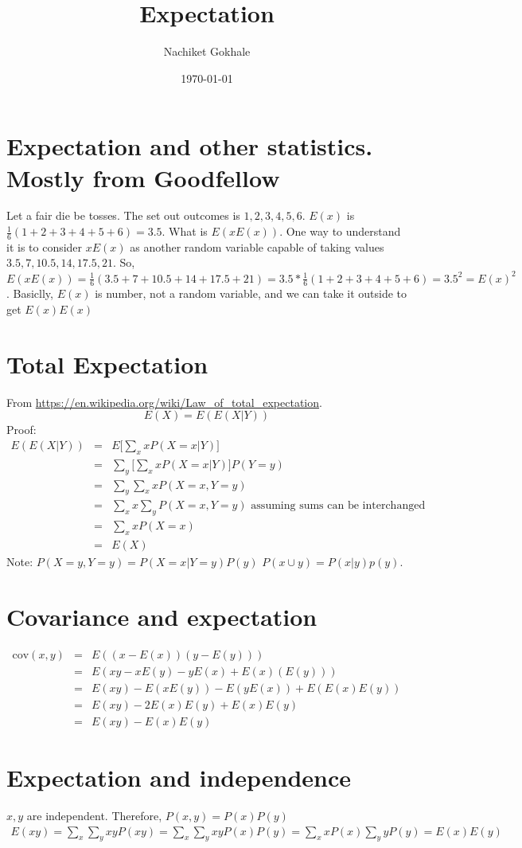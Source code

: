 \documentclass{article}
\newcommand{\beq}{\begin{equation}}
\newcommand{\eeq}{\end{equation}}
\newcommand{\ber}{\begin{eqnarray}}
\newcommand{\eer}{\end{eqnarray}}
\begin{document}
\title{Expectation}
\author{Nachiket Gokhale}
\date{\today}
\maketitle
\section{Expectation and other statistics. Mostly from Goodfellow}
Let a fair die be tosses. The set out outcomes is ${1,2,3,4,5,6}$. $E(x)$ is $\frac{1}{6}(1+2+3+4+5+6)=3.5$. What is $E(xE(x))$. One way to understand it is to consider $xE(x)$ as another random variable capable of taking values ${3.5,7,10.5,14,17.5,21}$. So, $E(xE(x))=\frac{1}{6}(3.5+7+10.5+14+17.5+21)=3.5*\frac{1}{6}(1+2+3+4+5+6)=3.5^2=E(x)^2$. Basiclly, $E(x)$ is number, not a random variable, and we can take it outside to get $E(x)E(x)$ 
\section{Total Expectation}
From \url{https://en.wikipedia.org/wiki/Law_of_total_expectation}.
\beq
E(X) = E(E(X|Y))
\eeq
Proof:
\ber
E(E(X|Y)) &=& E\Big[\sum_{x}xP(X=x|Y)\Big] \\
&=& \sum_y\Big[\sum_{x}xP(X=x|Y)\Big]P(Y=y) \\
&=& \sum_y\sum_xxP(X=x,Y=y) \\
&=& \sum_x x \sum_yP(X=x,Y=y) \text{ assuming sums can be interchanged } \\
&=& \sum_x x P(X=x) \\
&=& E(X)
\eer
Note: $P(X=y,Y=y)=P(X=x|Y=y)P(y)$  $P(x\cup{y}) = P(x|y)p(y)$.
\section{Covariance and expectation}
\ber
\text{cov}(x,y) &=& E((x-E(x))(y-E(y))) \\
&=& E(xy - xE(y) - yE(x) + E(x)(E(y))) \\
&=& E(xy)- E(xE(y)) - E(yE(x)) + E(E(x)E(y)) \\
&=& E(xy) -2E(x)E(y) + E(x)E(y) \\
&=& E(xy) - E(x)E(y)
\eer
\section{Expectation and independence}
$x,y$ are independent. Therefore, $P(x,y)=P(x)P(y)$
\ber
E(xy) = \sum_{x}\sum_y xy P(xy) =  \sum_{x}\sum_y xy P(x)P(y) = \sum_x xP(x) \sum_y yP(y) = E(x)E(y)
\eer
\end{document}
